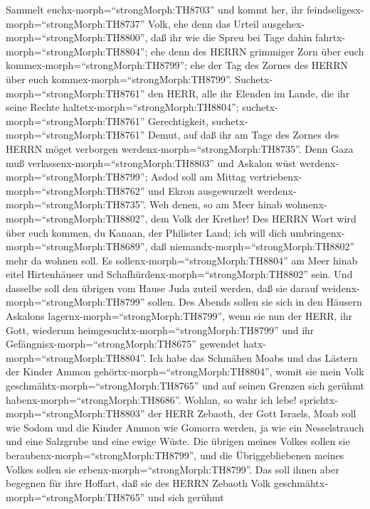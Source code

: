  Sammelt euchx-morph=``strongMorph:TH8703'' und kommt her,
ihr feindseligesx-morph=``strongMorph:TH8737'' Volk,  ehe
denn das Urteil ausgehex-morph=``strongMorph:TH8800'', daß ihr wie die
Spreu bei Tage dahin fahrtx-morph=``strongMorph:TH8804''; ehe denn des
HERRN grimmiger Zorn über euch kommex-morph=``strongMorph:TH8799''; ehe
der Tag des Zornes des HERRN über euch
kommex-morph=``strongMorph:TH8799''. 
Suchetx-morph=``strongMorph:TH8761'' den HERR, alle ihr Elenden im
Lande, die ihr seine Rechte haltetx-morph=``strongMorph:TH8804'';
suchetx-morph=``strongMorph:TH8761'' Gerechtigkeit,
suchetx-morph=``strongMorph:TH8761'' Demut, auf daß ihr am Tage des
Zornes des HERRN möget verborgen werdenx-morph=``strongMorph:TH8735''.
 Denn Gaza muß verlassenx-morph=``strongMorph:TH8803'' und
Askalon wüst werdenx-morph=``strongMorph:TH8799''; Asdod soll am Mittag
vertriebenx-morph=``strongMorph:TH8762'' und Ekron ausgewurzelt
werdenx-morph=``strongMorph:TH8735''.  Weh denen, so am Meer
hinab wohnenx-morph=``strongMorph:TH8802'', dem Volk der Krether! Des
HERRN Wort wird über euch kommen, du Kanaan, der Philister Land; ich
will dich umbringenx-morph=``strongMorph:TH8689'', daß
niemandx-morph=``strongMorph:TH8802'' mehr da wohnen soll. 
Es sollenx-morph=``strongMorph:TH8804'' am Meer hinab eitel Hirtenhäuser
und Schafhürdenx-morph=``strongMorph:TH8802'' sein.  Und
dasselbe soll den übrigen vom Hause Juda zuteil werden, daß sie darauf
weidenx-morph=``strongMorph:TH8799'' sollen. Des Abends sollen sie sich
in den Häusern Askalons lagernx-morph=``strongMorph:TH8799'', wenn sie
nun der HERR, ihr Gott, wiederum
heimgesuchtx-morph=``strongMorph:TH8799'' und ihr
Gefängnisx-morph=``strongMorph:TH8675'' gewendet
hatx-morph=``strongMorph:TH8804''.  Ich habe das Schmähen
Moabs und das Lästern der Kinder Ammon
gehörtx-morph=``strongMorph:TH8804'', womit sie mein Volk
geschmähtx-morph=``strongMorph:TH8765'' und auf seinen Grenzen sich
gerühmt habenx-morph=``strongMorph:TH8686''.  Wohlan, so
wahr ich lebe! sprichtx-morph=``strongMorph:TH8803'' der HERR Zebaoth,
der Gott Israels, Moab soll wie Sodom und die Kinder Ammon wie Gomorra
werden, ja wie ein Nesselstrauch und eine Salzgrube und eine ewige
Wüste. Die übrigen meines Volkes sollen sie
beraubenx-morph=``strongMorph:TH8799'', und die Übriggebliebenen meines
Volkes sollen sie erbenx-morph=``strongMorph:TH8799''.  Das
soll ihnen aber begegnen für ihre Hoffart, daß sie des HERRN Zebaoth
Volk geschmähtx-morph=``strongMorph:TH8765'' und sich gerühmt
